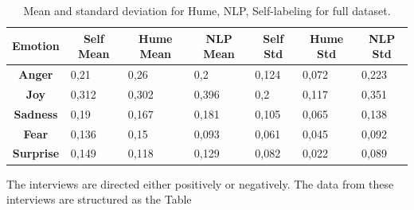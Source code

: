 \begin{table}[H]
    \begin{tabular}{c|l|l|l|l|l|l}
    \textbf{Emotion}  & \multicolumn{1}{c|}{\textbf{Self Mean}} & \multicolumn{1}{c|}{\textbf{Hume Mean}} & \multicolumn{1}{c|}{\textbf{NLP Mean}} & \multicolumn{1}{c|}{\textbf{Self Std}} & \multicolumn{1}{c|}{\textbf{Hume Std}} & \multicolumn{1}{c}{\textbf{NLP Std}} \\ \hline
    \textbf{Anger}    & 0,21                                               & 0,26                                    & 0,2                                    & 0,124                                           & 0,072                                  & 0,223                                \\
    \textbf{Joy}      & 0,312                                              & 0,302                                   & 0,396                                  & 0,2                                             & 0,117                                  & 0,351                                \\
    \textbf{Sadness}  & 0,19                                               & 0,167                                   & 0,181                                  & 0,105                                           & 0,065                                  & 0,138                                \\
    \textbf{Fear}     & 0,136                                              & 0,15                                    & 0,093                                  & 0,061                                           & 0,045                                  & 0,092                                \\
    \textbf{Surprise} & 0,149                                              & 0,118                                   & 0,129                                  & 0,082                                           & 0,022                                  & 0,089                               
    \end{tabular}
    \caption{Mean and standard deviation for Hume, NLP, Self-labeling for full dataset.}
    \label{tab:summery_rq2_rq3}
\end{table}

The interviews are directed either positively or negatively. 
The data from these interviews are structured as the Table 

